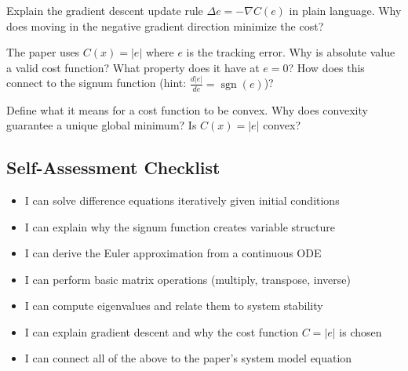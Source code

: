 Explain the gradient descent update rule $\Delta e = -\nabla C(e)$ in plain language. Why does moving in the negative gradient direction minimize the cost?

\begin{answerbox}\end{answerbox}

The paper uses $C(x) = |e|$ where $e$ is the tracking error. Why is absolute value a valid cost function? What property does it have at $e = 0$? How does this connect to the signum function (hint: $\tfrac{d|e|}{de} = \operatorname{sgn}(e)$)?

\begin{answerbox}\end{answerbox}

Define what it means for a cost function to be convex. Why does convexity guarantee a unique global minimum? Is $C(x) = |e|$ convex?

\begin{answerbox}\end{answerbox}

\subsection*{Self-Assessment Checklist}

\begin{itemize}[leftmargin=2em, label=$\square$]
	\item I can solve difference equations iteratively given initial conditions
	\item I can explain why the signum function creates variable structure
	\item I can derive the Euler approximation from a continuous ODE
	\item I can perform basic matrix operations (multiply, transpose, inverse)
	\item I can compute eigenvalues and relate them to system stability
	\item I can explain gradient descent and why the cost function $C = |e|$ is chosen
	\item I can connect all of the above to the paper's system model equation
\end{itemize}

\begin{notesbox}\end{notesbox}
